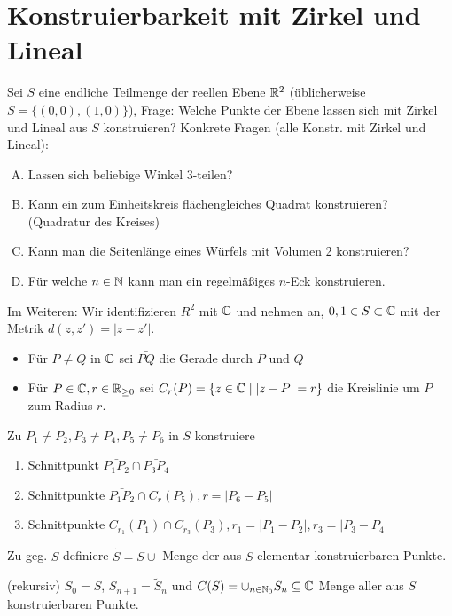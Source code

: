 \documentclass[a4paper]{report}
\begin{document}
\section{Konstruierbarkeit mit Zirkel und Lineal}
Sei $S$ eine endliche Teilmenge der reellen Ebene $\mathbb{R}^2$ (üblicherweise $S = \{(0,0), (1,0)\}$), Frage: Welche Punkte der Ebene lassen sich mit Zirkel und Lineal aus $S$ konstruieren? \newline
Konkrete Fragen (alle Konstr. mit Zirkel und Lineal):
\begin{enumerate}[A)]
  \item Lassen sich beliebige Winkel $3$-teilen?
  \item Kann ein zum Einheitskreis flächengleiches Quadrat konstruieren? (Quadratur des Kreises)
  \item Kann man die Seitenlänge eines Würfels mit Volumen 2 konstruieren?
  \item Für welche $n \in \mathbb{N}$ kann man ein regelmäßiges $n$-Eck konstruieren.
\end{enumerate}
Im Weiteren: Wir identifizieren $R^{2}$ mit $\mathbb{C}$ und nehmen an, $0, 1 \in S \subset \mathbb{C}$ mit der Metrik $d(z, z') = |z-z'|$.
\begin{itemize}
  \item Für $P \ne Q$ in $\mathbb{C}$ sei $\bar{PQ}$ die Gerade durch $P$ und $Q$
        \item Für $P \in \mathbb{C}, r \in \mathbb{R}_{\ge 0}$ sei $C_{r}(P) = \{z \in \mathbb{C} \mid |z - P| = r\}$ die Kreislinie um $P$ zum Radius $r$.
\end{itemize}
\begin{defi}
Zu $P_{1} \ne P_{2}, P_{3} \ne P_{4}, P_{5} \ne P_{6}$ in $S$ konstruiere
\begin{enumerate}[(1)]
  \item Schnittpunkt $\bar{P_{1}P_{2}} \cap \bar{P_{3}P_{4}}$
  \item Schnittpunkte $\bar{P_{1}P_{2}} \cap C_{r}(P_{5}), r = |P_{6} - P_{5}|$
  \item Schnittpunkte $C_{r_{1}}(P_{1}) \cap C_{r_{3}}(P_{3}), r_{1} = |P_{1} - P_{2}|,r_{3} = |P_{3} - P_{4}| $
\end{enumerate}
\begin{nota*}
Zu geg. $S$ definiere $\tilde S = S \cup$ Menge der aus $S$ elementar konstruierbaren Punkte.
\end{nota*}

\end{defi}
\begin{defi}
(rekursiv) $S_{0} = S$, $S_{n+1} = \tilde S_{n}$ und $C(S) = \cup_{{n \in \mathbb{N}_0}}S_{n} \subseteq \mathbb{C}$ Menge aller aus $S$ konstruierbaren Punkte.
\end{defi}
\end{document}
